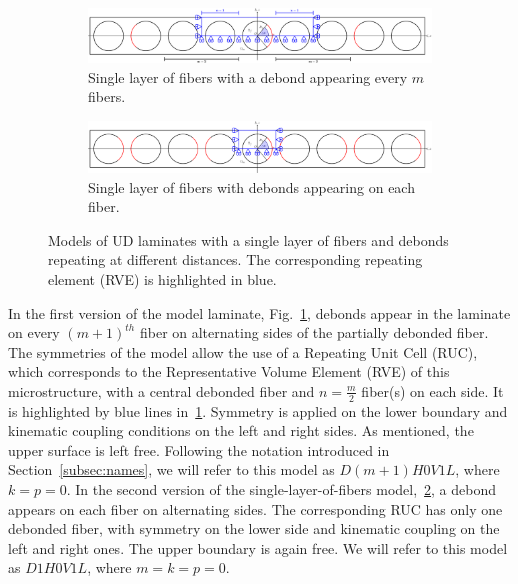 \documentclass[review]{elsarticle}
\begin{document}
\begin{figure}[!h]
\centering
    \begin{subfigure}[b]{\textwidth}
        \includegraphics[width=\textwidth]{freeThinPly.pdf}
        \caption{Single layer of fibers with a debond appearing every $m$ fibers.}\label{subfig:freethinply}
    \end{subfigure}

    \begin{subfigure}[b]{\textwidth}
        \includegraphics[width=\textwidth]{freeThinPlyAllDebonds.pdf}
        \caption{Single layer of fibers with debonds appearing on each fiber.}\label{subfig:freethinplyalldebonds}
    \end{subfigure} 

\caption{Models of UD laminates with a single layer of fibers and debonds repeating at different distances. The corresponding repeating element (RVE) is highlighted in blue.}\label{fig:laminateModelsA}
\end{figure}

In the first version of the model laminate, Fig.~\ref{subfig:freethinply}, debonds appear in the laminate on every $\left(m+1\right)^{th}$ fiber on alternating sides of the partially debonded fiber. The symmetries of the model allow the use of a Repeating Unit Cell (RUC), which corresponds to the Representative Volume Element (RVE) of this microstructure, with a central debonded fiber and $n=\frac{m}{2}$ fiber(s) on each side. It is highlighted by blue lines in~\ref{subfig:freethinply}. Symmetry is applied on the lower boundary and kinematic coupling conditions on the left and right sides. As mentioned, the upper surface is left free. Following the notation introduced in Section~\ref{subsec:names}, we will refer to this model as $D\left(m+1\right)H0V1L$, where $k=p=0$. In the second version of the single-layer-of-fibers model,~\ref{subfig:freethinplyalldebonds}, a debond appears on each fiber on alternating sides. The corresponding RUC has only one debonded fiber, with symmetry on the lower side and kinematic coupling on the left and right ones. The upper boundary is again free. We will refer to this model as $D1H0V1L$, where $m=k=p=0$.
\end{document}
